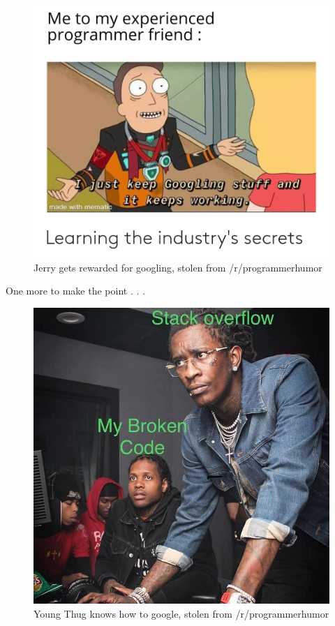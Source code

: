 \documentclass[
]{book}
\begin{document}
\begin{figure}

{\centering \includegraphics[width=6.94in]{images/08_troubleshooting/meme2} 

}

\caption{Jerry gets rewarded for googling, stolen from /r/programmerhumor}\label{fig:unnamed-chunk-140}
\end{figure}

One more to make the point . . .

\begin{figure}

{\centering \includegraphics[width=10.4in]{images/08_troubleshooting/meme3} 

}

\caption{Young Thug knows how to google, stolen from /r/programmerhumor}\label{fig:unnamed-chunk-141}
\end{figure}
\end{document}
